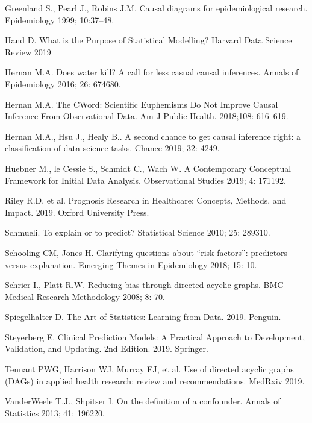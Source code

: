\documentclass[letterpaper,10pt,english]{jupyterBook}
\begin{document}
\sphinxAtStartPar
Greenland S., Pearl J., Robins J.M. Causal diagrams for epidemiological research. Epidemiology 1999; 10:37–48.

\sphinxAtStartPar
Hand D. What is the Purpose of Statistical Modelling? Harvard Data Science Review 2019 

\sphinxAtStartPar
Hernan M.A. Does water kill? A call for less casual causal inferences. Annals of Epidemiology 2016; 26: 674\sphinxhyphen{}680.

\sphinxAtStartPar
Hernan M.A. The C\sphinxhyphen{}Word: Scientific Euphemisms Do Not Improve Causal Inference From Observational Data. Am J Public Health. 2018;108: 616–619.

\sphinxAtStartPar
Hernan M.A., Hsu J., Healy B.. A second chance to get causal inference right: a classification of data science tasks. Chance 2019; 32: 42\sphinxhyphen{}49.

\sphinxAtStartPar
Huebner M., le Cessie S., Schmidt C., Wach W. A Contemporary Conceptual Framework for Initial Data Analysis. Observational Studies 2019; 4: 171\sphinxhyphen{}192.

\sphinxAtStartPar
Riley R.D. et al. Prognosis Research in Healthcare: Concepts, Methods, and Impact. 2019. Oxford University Press.

\sphinxAtStartPar
Schmueli. To explain or to predict? Statistical Science 2010; 25: 289\sphinxhyphen{}310.

\sphinxAtStartPar
Schooling CM, Jones H. Clarifying questions about “risk factors”: predictors versus explanation. Emerging Themes in Epidemiology 2018; 15: 10.

\sphinxAtStartPar
Schrier I., Platt R.W. Reducing bias through directed acyclic graphs. BMC Medical Research Methodology 2008; 8: 70.

\sphinxAtStartPar
Spiegelhalter D. The Art of Statistics: Learning from Data. 2019. Penguin.

\sphinxAtStartPar
Steyerberg E. Clinical Prediction Models: A Practical Approach to Development, Validation, and Updating. 2nd Edition. 2019. Springer.

\sphinxAtStartPar
Tennant PWG, Harrison WJ, Murray EJ, et al. Use of directed acyclic graphs (DAGs) in applied health research: review and recommendations. MedRxiv 2019.

\sphinxAtStartPar
VanderWeele T.J., Shpitser I. On the definition of a confounder. Annals of Statistics 2013; 41: 196\sphinxhyphen{}220.
\end{document}
